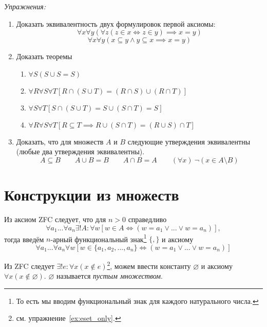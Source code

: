 \newcommand\eset{\varnothing}
\vspace{1em}
{\it Упражнения:}
\begin{enumerate}
	\item{}Доказать эквивалентность двух формулировок первой аксиомы:
	\[
		\forall x\forall y(\forall z(z\in x\iff z\in y)\implies x=y)
	\]
	\[
		\forall x\forall y(x\subseteq y\land y\subseteq x\implies x=y)
	\]

	\item{}Доказать теоремы
	\begin{fullwidth}
		\begin{multicols}{2}
			\begin{enumerate}
				\item{}$\forall S(S\cup S=S)$
				\item{}$\forall R\forall S\forall T[R\cap (S\cup T)=(R\cap S)\cup (R\cap T)]$
				\item{}$\forall S\forall T[S\cap (S\cup T)=S\cup (S\cap T)=S]$
				\item{}$\forall R\forall S\forall T[R\subseteq T
							\implies R\cup (S\cap T)=(R\cup S)\cap T]$
			\end{enumerate}
		\end{multicols}
	\end{fullwidth}

	\item{}Доказать, что для множеств $A$ и $B$ следующие утверждения эквивалентны
	(любые два утверждения эквивалентны).
	\[
		A\subseteq B\qquad A\cup B=B\qquad A\cap B=A
		\qquad (\forall x)~\lnot(x\in A\setminus B)
	\]
\end{enumerate}

\section{Конструкции из множеств}

Из аксиом ZFC следует, что для $n>0$ справедливо
\[
	\forall a_1...\forall a_{n}\exists !A:\forall w
		[w\in A\iff (w=a_1\lor...\lor w=a_{n})],
\]
тогда введём $n$-арный функциональный знак\footnote{
	То есть мы вводим функциональный знак для каждого натурального числа.
} $\{,\}$ и аксиому
\[
	\forall a_1...\forall a_{n}\forall w
	[w\in \{a_1,a_2,...,a_{n}\}\iff (w=a_1\lor ...\lor w=a_{n})]
\]

Из ZFC следует ${\exists !e:\forall x(x\notin e)}$\footnote{
	см. упражнение~\ref{ex:eset_only}.
}, можем ввести константу $\eset$ и аксиому $\forall x(x\notin \eset)$.
$\eset$ называется {\it пустым множеством}.

